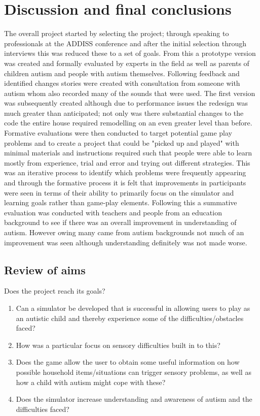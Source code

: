 \chapter{Discussion and final conclusions}

The overall project started by selecting the project; through speaking to professionals at the ADDISS conference and after the initial selection through interviews this was reduced these to a set of goals.  
From this a prototype version was created and formally evaluated by experts in the field as well as parents of children autism and people with autism themselves. Following feedback and identified changes stories were created with consultation from someone with autism whom also recorded many of the sounds that were used.
The first version was subsequently created although due to performance issues the redesign was much greater than anticipated; not only was there substantial changes to the code the entire house required remodelling on an even greater level than before. 
Formative evaluations were then conducted to target potential game play problems and to create a project that could be "picked up and played" with minimal materials and instructions required such that people were able to learn mostly from experience, trial and error and trying out different strategies. This was an iterative process to identify which problems were frequently appearing and through the formative process it is felt that improvements in participants were seen in terms of their ability to primarily focus on the simulator and learning goals rather than game-play elements. Following this a summative evaluation was conducted with teachers and people from an education background to see if there was an overall improvement in understanding of autism. However owing many came from autism backgrounds not much of an improvement was seen although understanding definitely was not made worse.

\section{Review of aims}

Does the project reach its goals?
\begin{enumerate}
\item Can a simulator be developed that is successful in allowing users to play as an autistic child and thereby experience some of the difficulties/obstacles faced?
\item How was a particular focus on sensory difficulties built in to this?
\item Does the game allow the user to obtain some useful information on how possible household items/situations can trigger sensory problems, as well as how a child with autism might cope with these?
\item Does the simulator increase understanding and awareness of autism and the difficulties faced?
\end{enumerate}

